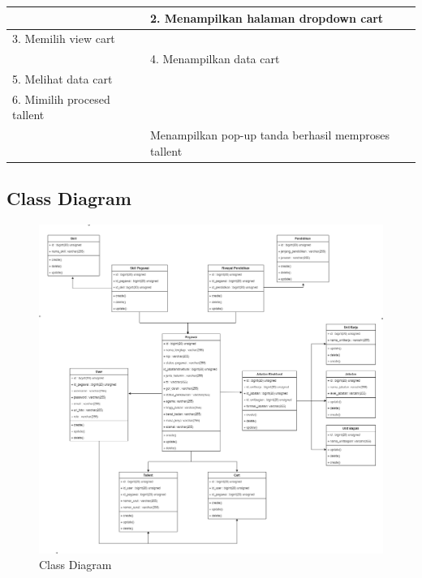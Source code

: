 \begin{enumerate}
\begin{table}
\begin{tabular}{ | l | p{70mm}|}
			\hline
			
			&  2.	Menampilkan halaman  dropdown cart \\
			
			\hline
			
			3. Memilih view cart & \\
			
			\hline
			
			& 4. Menampilkan data cart \\
			\hline
			
			5. Melihat data cart & \\
			\hline
			
			6. Mimilih procesed tallent &  \\
			\hline
			
			& Menampilkan pop-up tanda berhasil memproses tallent \\
			\hline
			
	\end{tabular}
\end{table}

\end{enumerate}

\subsection{Class Diagram}

\begin{figure}
	\centering
	\includegraphics[width=1\textwidth]
	{pics/diagram/classdiagram.png}
	\caption{Class Diagram}
	\label{fig:32}
\end{figure}

